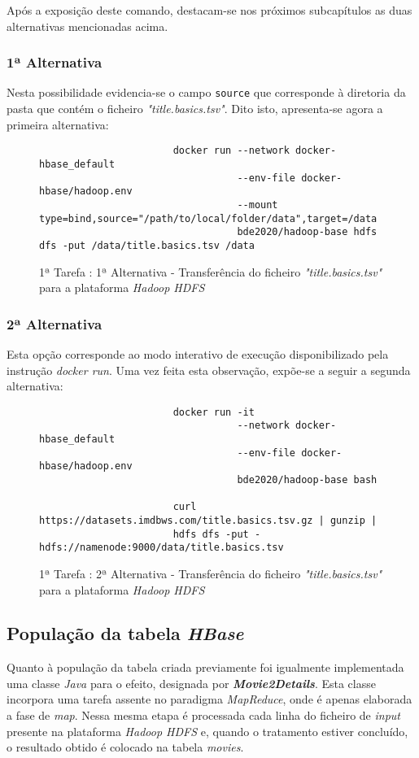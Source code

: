 \documentclass[a4paper]{report}
\begin{document}
{		Após a exposição deste comando, destacam-se nos próximos subcapítulos as duas alternativas mencionadas acima.

			\subsubsection{1ª Alternativa}
			Nesta possibilidade evidencia-se o campo \texttt{source} que corresponde à diretoria da pasta que contém o ficheiro \textit{"title.basics.tsv"}.
			Dito isto, apresenta-se agora a primeira alternativa:
			\begin{figure}[H]
				{
					\color{teal}
					\begin{verbatim}
					   docker run --network docker-hbase_default
					              --env-file docker-hbase/hadoop.env
					              --mount type=bind,source="/path/to/local/folder/data",target=/data
					              bde2020/hadoop-base hdfs dfs -put /data/title.basics.tsv /data
					\end{verbatim}
				}
				\caption{1ª Tarefa : 1ª Alternativa - Transferência do ficheiro \textit{"title.basics.tsv"} para a plataforma \textit{Hadoop HDFS}}
				\label{fig:10}
			\end{figure}

			\subsubsection{2ª Alternativa}
			Esta opção corresponde ao modo interativo de execução disponibilizado pela instrução \textit{docker run}.
			Uma vez feita esta observação, expõe-se a seguir a segunda alternativa:
			\begin{figure}[H]
				{
					\color{teal}
					\begin{verbatim}
					   docker run -it
					              --network docker-hbase_default
					              --env-file docker-hbase/hadoop.env
					              bde2020/hadoop-base bash

					   curl https://datasets.imdbws.com/title.basics.tsv.gz | gunzip |
					   hdfs dfs -put - hdfs://namenode:9000/data/title.basics.tsv
					\end{verbatim}
				}
				\caption{1ª Tarefa : 2ª Alternativa - Transferência do ficheiro \textit{"title.basics.tsv"} para a plataforma \textit{Hadoop HDFS}}
				\label{fig:11}
			\end{figure}

		\subsection{População da tabela \textit{HBase}} \label{subsec:Task1-3}
		Quanto à população da tabela criada previamente foi igualmente implementada uma classe \textit{Java} para o efeito, designada por \textbf{\textit{Movie2Details}}.
		Esta classe incorpora uma tarefa assente no paradigma \textit{MapReduce}, onde é apenas elaborada a fase de \textit{map}.
		Nessa mesma etapa é processada cada linha do ficheiro de \textit{input} presente na plataforma \textit{Hadoop HDFS} e, quando o tratamento estiver concluído, o resultado obtido é colocado na tabela \textit{movies}.

}
\end{document}

